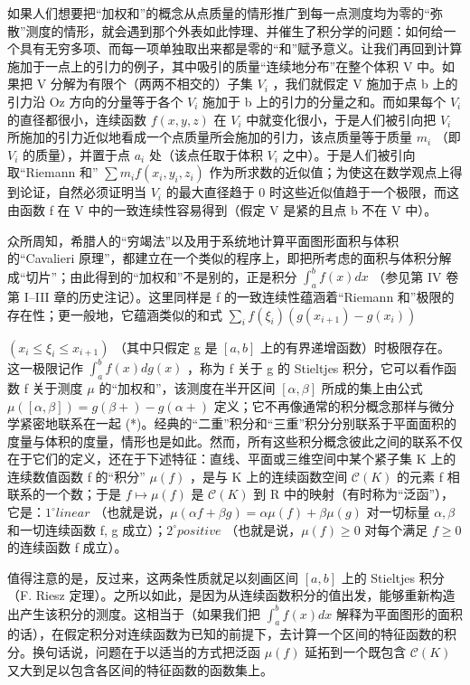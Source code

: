 如果人们想要把“加权和”的概念从点质量的情形推广到每一点测度均为零的“弥散”测度的情形，就会遇到那个外表如此悖理、并催生了积分学的问题：如何给一个具有无穷多项、而每一项单独取出来都是零的“和”赋予意义。让我们再回到计算施加于一点上的引力的例子，其中吸引的质量“连续地分布”在整个体积 V 中。如果把 V 分解为有限个（两两不相交的）子集 \(V_{i}\) ，我们就假定 V 施加于点 b 上的引力沿 Oz 方向的分量等于各个 \(V_{i}\) 施加于 b 上的引力的分量之和。而如果每个 \(V_{i}\) 的直径都很小，连续函数 \(f(x,y,z)\) 在 \(V_{i}\) 中就变化很小，于是人们被引向把 \(V_{i}\) 所施加的引力近似地看成一个点质量所会施加的引力，该点质量等于质量 \(m_{i}\) （即 \(V_{i}\) 的质量），并置于点 \(a_{i}\) 处（该点任取于体积 \(V_{i}\) 之中）。于是人们被引向取“Riemann 和” \(\sum m_{i}f(x_{i},y_{i},z_{i})\) 作为所求数的近似值；为使这在数学观点上得到论证，自然必须证明当 \(V_{i}\) 的最大直径趋于 0 时这些近似值趋于一个极限，而这由函数 f 在 V 中的一致连续性容易得到（假定 V 是紧的且点 b 不在 V 中）。

众所周知，希腊人的“穷竭法”以及用于系统地计算平面图形面积与体积的“Cavalieri 原理”，都建立在一个类似的程序上，即把所考虑的面积与体积分解成“切片”；由此得到的“加权和”不是别的，正是积分 \(\int_{a}^{b} f(x) dx\) （参见第 IV 卷第 I--III 章的历史注记）。这里同样是 f 的一致连续性蕴涵着“Riemann 和”极限的存在性；更一般地，它蕴涵类似的和式 \(\sum_{i} f(\xi_{i})(g(x_{i+1}) - g(x_{i}))\)

\((x_{i} \leqslant \xi_{i} \leqslant x_{i+1})\) （其中只假定 g 是 \([a, b]\) 上的有界递增函数）时极限存在。这一极限记作 \(\int_{a}^{b} f(x) dg(x)\) ，称为 f 关于 g 的 Stieltjes 积分，它可以看作函数 f 关于测度 \(\mu\) 的“加权和”，该测度在半开区间 \([\alpha, \beta]\) 所成的集上由公式 \(\mu([\alpha, \beta]) = g(\beta+) - g(\alpha+)\) 定义；它不再像通常的积分概念那样与微分学紧密地联系在一起 (*)。经典的“二重”积分和“三重”积分分别联系于平面面积的度量与体积的度量，情形也是如此。然而，所有这些积分概念彼此之间的联系不仅在于它们的定义，还在于下述特征：直线、平面或三维空间中某个紧子集 K 上的连续数值函数 f 的“积分” \(\mu(f)\) ，是与 K 上的连续函数空间 \(\mathcal{C}(K)\) 的元素 f 相联系的一个数；于是 \(f \mapsto \mu(f)\) 是 \(\mathcal{C}(K)\) 到 R 中的映射（有时称为“泛函”），它是：\(1^{\circ} linear\) （也就是说，\(\mu(\alpha f + \beta g) = \alpha \mu(f) + \beta \mu(g)\) 对一切标量 \(\alpha, \beta\) 和一切连续函数 f, g 成立）；\(2^{\circ} positive\) （也就是说，\(\mu(f) \geqslant 0\) 对每个满足 \(f \geqslant 0\) 的连续函数 f 成立）。

值得注意的是，反过来，这两条性质就足以刻画区间 \([a,b]\) 上的 Stieltjes 积分（F. Riesz 定理）。之所以如此，是因为从连续函数积分的值出发，能够重新构造出产生该积分的测度。这相当于（如果我们把 \(\int_{a}^{b}f(x)dx\) 解释为平面图形的面积的话），在假定积分对连续函数为已知的前提下，去计算一个区间的特征函数的积分。换句话说，问题在于以适当的方式把泛函 \(\mu(f)\) 延拓到一个既包含 \(\mathcal{C}(K)\) 又大到足以包含各区间的特征函数的函数集上。

